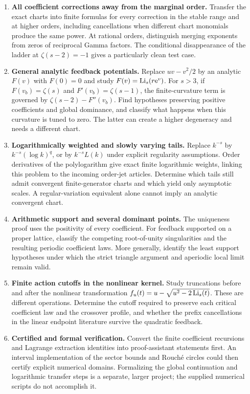 \begin{enumerate}[label=\textbf{Q\arabic*.},leftmargin=2.7em]
\item \textbf{All coefficient corrections away from the marginal
order.}
Transfer the exact charts into finite formulas for every correction
in the stable range and at higher orders, including cancellations
when different chart monomials produce the same power.  At rational
orders, distinguish merging exponents from zeros of reciprocal Gamma
factors.  The conditional disappearance of the ladder at
$\zeta(s-2)=-1$ gives a particularly clean test case.

\item \textbf{General analytic feedback potentials.}
Replace $uv-v^2/2$ by an analytic $F(v)$ with $F(0)=0$ and study
$F(v)=\operatorname{Li}_s(r\mathrm e^v)$.  For $s>3$, if $F(v_b)=\zeta(s)$ and
$F'(v_b)=\zeta(s-1)$, the finite-curvature term is governed by
$\zeta(s-2)-F''(v_b)$.  Find hypotheses preserving positive
coefficients and global dominance, and classify what happens when
this curvature is tuned to zero.  The latter can create a higher
degeneracy and needs a different chart.

\item \textbf{Logarithmically weighted and slowly varying tails.}
Replace $k^{-s}$ by $k^{-s}(\log k)^q$, or by
$k^{-s}L(k)$ under explicit regularity assumptions.  Order derivatives
of the polylogarithm give exact finite logarithmic weights, linking
this problem to the incoming order-jet articles.  Determine which
tails still admit convergent finite-generator charts and which yield
only asymptotic scales.  A regular-variation equivalent alone cannot
imply an analytic convergent chart.

\item \textbf{Arithmetic support and several dominant points.}
The uniqueness proof uses the positivity of every coefficient.
For feedback supported on a proper lattice, classify the competing
root-of-unity singularities and the resulting periodic coefficient
laws.  More generally, identify the least support hypotheses under
which the strict triangle argument and aperiodic local limit remain
valid.

\item \textbf{Finite action cutoffs in the nonlinear kernel.}
Study truncations before and after the nonlinear transformation
$f_u(t)=u-\sqrt{u^2-2\operatorname{Li}_s(t)}$.  These are different operations.
Determine the cutoff required to preserve each critical coefficient
law and the crossover profile, and whether the prefix cancellations
in the linear endpoint literature survive the quadratic feedback.

\item \textbf{Certified and formal verification.}
Convert the finite coefficient recursions and Lagrange extraction
identities into proof-assistant statements first.  An interval
implementation of the sector bounds and Rouch\'e circles could then
certify explicit numerical domains.  Formalizing the global
continuation and logarithmic transfer steps is a separate, larger
project; the supplied numerical scripts do not accomplish it.
\end{enumerate}

